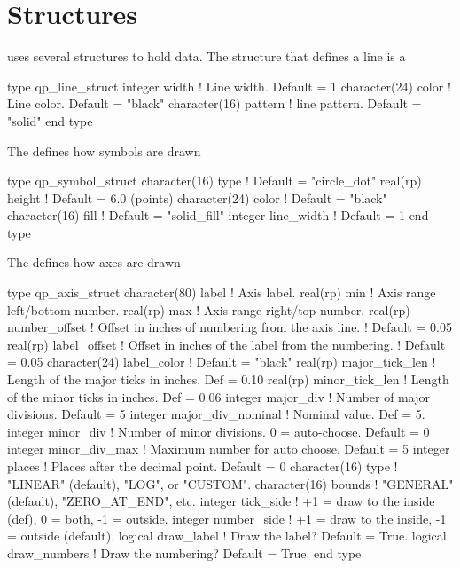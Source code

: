 \section{Structures}
\label{s:qp.structs}

\quickplot uses several structures to hold data. The structure that
defines a line is a 
\begin{example}
  type qp_line_struct
    integer width         ! Line width.   Default = 1
    character(24) color   ! Line color.   Default = "black"
    character(16) pattern ! line pattern. Default = "solid"
  end type
\end{example}

The  defines how symbols are drawn 
\begin{example}
  type qp_symbol_struct
    character(16)  type        ! Default = "circle_dot"
    real(rp) height            ! Default = 6.0 (points)
    character(24)  color       ! Default = "black"
    character(16)  fill        ! Default = "solid_fill"
    integer  line_width        ! Default = 1
  end type
\end{example}

The  defines how axes are drawn 
\begin{example}
  type qp_axis_struct
    character(80) label       ! Axis label.
    real(rp) min              ! Axis range left/bottom number.
    real(rp) max              ! Axis range right/top number.
    real(rp) number_offset    ! Offset in inches of numbering from the axis line. 
                              !  Default = 0.05
    real(rp) label_offset     ! Offset in inches of the label from the numbering.
                              !  Default = 0.05
    character(24) label_color ! Default = "black"
    real(rp) major_tick_len   ! Length of the major ticks in inches. Def = 0.10
    real(rp) minor_tick_len   ! Length of the minor ticks in inches. Def = 0.06
    integer major_div         ! Number of major divisions. Default = 5
    integer major_div_nominal ! Nominal value. Def = 5.
    integer minor_div         ! Number of minor divisions. 0 = auto-choose. Default = 0
    integer minor_div_max     ! Maximum number for auto choose. Default = 5
    integer places            ! Places after the decimal point. Default = 0
    character(16) type        ! "LINEAR" (default), "LOG", or "CUSTOM".
    character(16) bounds      ! "GENERAL" (default), "ZERO_AT_END", etc.
    integer tick_side         ! +1 = draw to the inside (def), 0 = both, -1 = outside.
    integer number_side       ! +1 = draw to the inside, -1 = outside (default).
    logical draw_label        ! Draw the label? Default = True.
    logical draw_numbers      ! Draw the numbering? Default = True.
  end type
\end{example}

